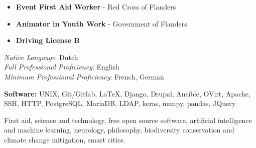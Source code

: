 
\begin{itemize}
    \item \textbf{Event First Aid Worker} - Red Cross of Flanders
    \item \textbf{Animator in Youth Work} - Government of Flanders
    \item \textbf{Driving License B}
\end{itemize}








\textit{Native Language}: Dutch \\
\textit{Full Professional Proficiency}: English \\
\textit{Minimum Professional Proficiency}: French, German \\





\smallskip

\textbf{Software:} UNIX, Git/Gitlab, \LaTeX, Django, Drupal, Ansible, OVirt, Apache, SSH, HTTP, PostgreSQL, MariaDB, LDAP, keras, numpy, pandas, JQuery

First aid, science and technology, free open source software, artificial intelligence and machine learning, neurology, philosophy, biodiversity conservation and climate change mitigation, smart cities.

